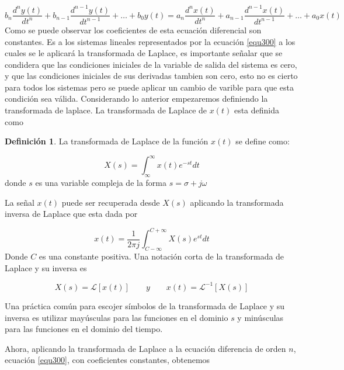 \documentclass[12pt]{book}
\theoremstyle{definition}
\newtheorem{dfn}{Definición}[section]
\theoremstyle{remark}
\theoremstyle{plain}
\begin{document}
\begin{equation}
\label{equ300}
b_n \frac{d^n y(t)}{dt^n}+b_{n-1} \frac{d^{n-1} y(t)}{dt^{n-1}}+ \dotsc +b_0 y(t)= a_n \frac{d^n x(t)}{dt^n}+a_{n-1} \frac{d^{n-1} x(t)}{dt^{n-1}}+ \dotsc +a_0 x(t)
\end{equation}
Como se puede observar los coeficientes de esta ecuación diferencial son constantes. Es a los sistemas lineales representados por la ecuación \ref{equ300} a los cuales se le aplicará la transformada de Laplace, es importante señalar que se condidera que las condiciones iniciales de la variable de salida del sistema es cero, y que las condiciones iniciales de sus derivadas tambien son cero, esto no es cierto para todos los sistemas pero se puede aplicar un cambio de varible para que esta condición sea válida. Considerando lo anterior empezaremos definiendo la transformada de laplace. La transformada de Laplace de $x(t)$ esta definida como

\begin{dfn}
\label{def301}
La transformada de Laplace de la función $x(t)$ se define como:

\begin{equation}
\label{equ301}
 X(s)=\int_{\infty}^{\infty} x(t) e^{-s t}dt
\end{equation}
donde $s$ es una variable compleja de la forma $s=\sigma +j \omega$
\end{dfn}


La señal $x(t)$ puede ser recuperada desde $X(s)$ aplicando la transformada inversa de Laplace que esta dada por

\begin{equation}
\label{equ302}
 x(t)=\frac{1}{2 \pi j} \int_{C-\infty}^{C+\infty} X(s) e^{s t}dt
\end{equation}
Donde $C$ es una constante positiva. Una notación corta de la transformada de Laplace y su inversa es

\begin{displaymath}
X(s) = \mathcal{L} [x(t)] \qquad y \qquad x(t)= \mathcal{L} ^{-1}[ X(s)]
\end{displaymath}

Una práctica común para escojer símbolos de la transformada de Laplace y su inversa es utilizar mayúsculas para las funciones en el dominio $s$ y minúsculas para las funciones en el dominio del tiempo.

Ahora, aplicando la transformada de Laplace a la ecuación diferencia de orden $n$, ecuación \ref{equ300}, con coeficientes constantes, obtenemos
\end{document}
